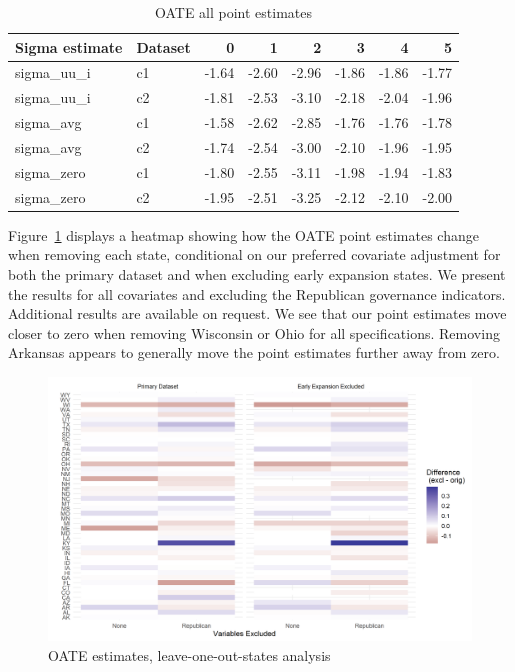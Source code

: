 \documentclass{article}
\begin{document}
\begin{appendix}
\begin{table}[ht]
\centering
\caption{OATE all point estimates}
\label{tab:oatesensitive}
\begin{tabular}{llrrrrrr}
  \hline
Sigma estimate & Dataset & 0 & 1 & 2 & 3 & 4 & 5 \\ 
  \hline
sigma\_uu\_i & c1 & -1.64 & -2.60 & -2.96 & -1.86 & -1.86 & -1.77 \\ 
  sigma\_uu\_i & c2 & -1.81 & -2.53 & -3.10 & -2.18 & -2.04 & -1.96 \\ 
  sigma\_avg & c1 & -1.58 & -2.62 & -2.85 & -1.76 & -1.76 & -1.78 \\ 
  sigma\_avg & c2 & -1.74 & -2.54 & -3.00 & -2.10 & -1.96 & -1.95 \\ 
  sigma\_zero & c1 & -1.80 & -2.55 & -3.11 & -1.98 & -1.94 & -1.83 \\ 
  sigma\_zero & c2 & -1.95 & -2.51 & -3.25 & -2.12 & -2.10 & -2.00 \\ 
   \hline
\end{tabular}
\end{table}

Figure~\ref{fig:oateheatmap} displays a heatmap showing how the OATE point estimates change when removing each state, conditional on our preferred covariate adjustment for both the primary dataset and when excluding early expansion states. We present the results for all covariates and excluding the Republican governance indicators. Additional results are available on request. We see that our point estimates move closer to zero when removing Wisconsin or Ohio for all specifications. Removing Arkansas appears to generally move the point estimates further away from zero.

\begin{figure}[]
\begin{center}
    \caption{OATE estimates, leave-one-out-states analysis}
    \label{fig:oateheatmap}
    \includegraphics[scale=0.6]{01_Plots/oate-loo-state-cov-group-heatmap-states.png}
\end{center}
\end{figure}

\end{appendix}
\end{document}
